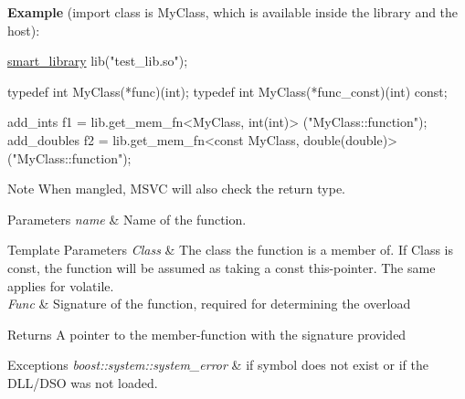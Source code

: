 {\bfseries Example} (import class is My\+Class, which is available inside the library and the host)\+:


\begin{DoxyCode}
\hyperlink{a00281_af1fa4c4ed871e889f92f4c11d574d91f}{smart\_library} lib(\textcolor{stringliteral}{"test\_lib.so"});

\textcolor{keyword}{typedef} \textcolor{keywordtype}{int}      MyClass(*func)(int);
\textcolor{keyword}{typedef} \textcolor{keywordtype}{int}   MyClass(*func\_const)(int) \textcolor{keyword}{const};

add\_ints     f1 = lib.get\_mem\_fn<MyClass, int(\textcolor{keywordtype}{int})>              (\textcolor{stringliteral}{"MyClass::function"});
add\_doubles  f2 = lib.get\_mem\_fn<\textcolor{keyword}{const} MyClass, double(\textcolor{keywordtype}{double})>(\textcolor{stringliteral}{"MyClass::function"});
\end{DoxyCode}


\begin{DoxyNote}{Note}
When mangled, M\+S\+VC will also check the return type.
\end{DoxyNote}

\begin{DoxyParams}{Parameters}
{\em name} & Name of the function. \\
\hline
\end{DoxyParams}

\begin{DoxyTemplParams}{Template Parameters}
{\em Class} & The class the function is a member of. If Class is const, the function will be assumed as taking a const this-\/pointer. The same applies for volatile. \\
\hline
{\em Func} & Signature of the function, required for determining the overload \\
\hline
\end{DoxyTemplParams}
\begin{DoxyReturn}{Returns}
A pointer to the member-\/function with the signature provided
\end{DoxyReturn}

\begin{DoxyExceptions}{Exceptions}
{\em boost\+::system\+::system\+\_\+error} & if symbol does not exist or if the D\+L\+L/\+D\+SO was not loaded. \\
\hline
\end{DoxyExceptions}
